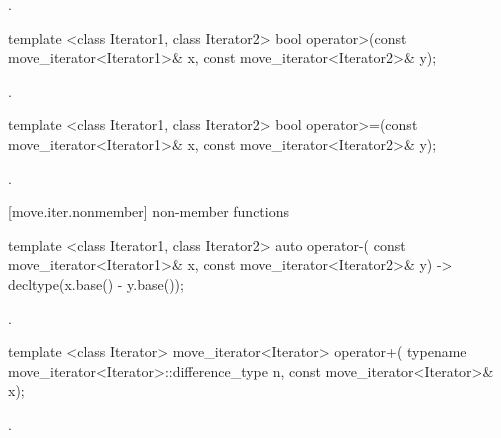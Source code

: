 \begin{itemdescr}
\pnum
\returns {}.
\end{itemdescr}

%
%
\begin{itemdecl}
template <class Iterator1, class Iterator2>
bool operator>(const move_iterator<Iterator1>& x, const move_iterator<Iterator2>& y);
\end{itemdecl}

\begin{itemdescr}
\pnum
\returns {}.
\end{itemdescr}

%
%
\begin{itemdecl}
template <class Iterator1, class Iterator2>
bool operator>=(const move_iterator<Iterator1>& x, const move_iterator<Iterator2>& y);
\end{itemdecl}

\begin{itemdescr}
\pnum
\returns {}.
\end{itemdescr}

[move.iter.nonmember]{ non-member functions}

%
%
\begin{itemdecl}
template <class Iterator1, class Iterator2>
    auto operator-(
    const move_iterator<Iterator1>& x,
    const move_iterator<Iterator2>& y) -> decltype(x.base() - y.base());
\end{itemdecl}

\begin{itemdescr}
\pnum
\returns {}.
\end{itemdescr}

%
%
\begin{itemdecl}
template <class Iterator>
  move_iterator<Iterator> operator+(
    typename move_iterator<Iterator>::difference_type n, const move_iterator<Iterator>& x);
\end{itemdecl}

\begin{itemdescr}
\pnum
\returns {}.
\end{itemdescr}

